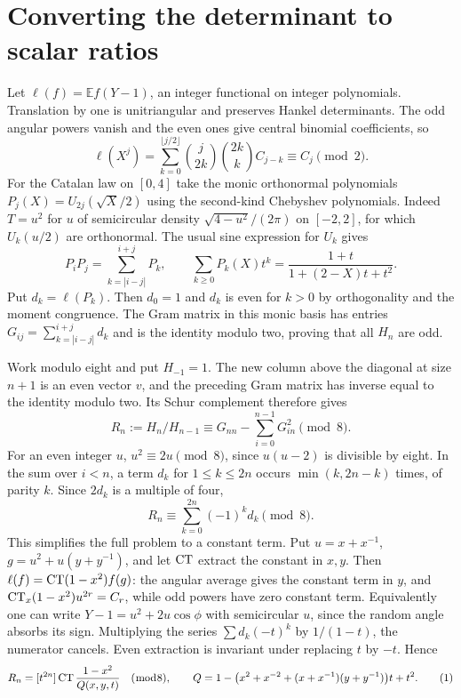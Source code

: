 \documentclass[11pt]{article}
\begin{document}
\section{Converting the determinant to scalar ratios}
Let $\ell(f)=\mathbb E f(Y-1)$, an integer functional on integer polynomials. Translation by one is unitriangular and preserves Hankel determinants. The odd angular powers vanish and the even ones give central binomial coefficients, so
\[
 \ell(X^j)=\sum_{k=0}^{\lfloor j/2\rfloor}
        \binom{j}{2k}\binom{2k}{k} C_{j-k}\equiv C_j\pmod2 .
\]
For the Catalan law on $[0,4]$ take the monic orthonormal polynomials $P_j(X)=U_{2j}(\sqrt X/2)$ using the second-kind Chebyshev polynomials. Indeed $T=u^2$ for $u$ of semicircular density $\sqrt{4-u^2}/(2\pi)$ on $[-2,2]$, for which $U_k(u/2)$ are orthonormal. The usual sine expression for $U_k$ gives
\[
 P_iP_j=\sum_{k=|i-j|}^{i+j}P_k,\qquad
 \sum_{k\ge0}P_k(X)t^k=\frac{1+t}{1+(2-X)t+t^2}.
\]
Put $d_k=\ell(P_k)$. Then $d_0=1$ and $d_k$ is even for $k>0$ by orthogonality and the moment congruence. The Gram matrix in this monic basis has entries
$G_{ij}=\sum_{k=|i-j|}^{i+j}d_k$ and is the identity modulo two, proving that all $H_n$ are odd.

Work modulo eight and put $H_{-1}=1$. The new column above the diagonal at size $n+1$ is an even vector $v$, and the preceding Gram matrix has inverse equal to the identity modulo two. Its Schur complement therefore gives
\[
 R_n:=H_n/H_{n-1}\equiv G_{nn}-\sum_{i=0}^{n-1}G_{in}^2\pmod8 .
\]
For an even integer $u$, $u^2\equiv2u\pmod8$, since $u(u-2)$ is divisible by eight. In the sum over $i<n$, a term $d_k$ for $1\le k\le2n$ occurs $\min(k,2n-k)$ times, of parity $k$. Since $2d_k$ is a multiple of four,
\[
 R_n\equiv \sum_{k=0}^{2n}(-1)^k d_k\pmod8 .
\]
This simplifies the full problem to a constant term. Put $u=x+x^{-1}$, $g=u^2+u(y+y^{-1})$, and let $\operatorname{CT}$ extract the constant in $x,y$. Then $\ell(f)=\operatorname{CT}(1-x^2)f(g)$: the angular average gives the constant term in $y$, and $\operatorname{CT}_x(1-x^2)u^{2r}=C_r$, while odd powers have zero constant term. Equivalently one can write $Y-1=u^2+2u\cos\phi$ with semicircular $u$, since the random angle absorbs its sign. Multiplying the series $\sum d_k(-t)^k$ by $1/(1-t)$, the numerator cancels. Even extraction is invariant under replacing $t$ by $-t$. Hence
\[
 R_n=[t^{2n}]\operatorname{CT}\frac{1-x^2}{Q(x,y,t)}\quad(\bmod 8),\qquad
 Q=1-\big(x^2+x^{-2}+(x+x^{-1})(y+y^{-1})\big)t+t^2.
 \tag{1}
\]
\end{document}
